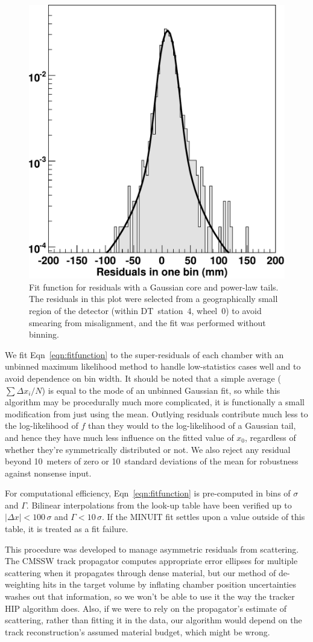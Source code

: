 \documentclass[12pt]{article}
\begin{document}
\begin{figure}
\begin{center} \includegraphics[width=0.4\linewidth]{fitfunction.pdf} \end{center}
\caption{Fit function for residuals with a Gaussian core and power-law tails.  The residuals in this plot were selected from a geographically small region of the detector (within DT~station~4, wheel~0) to avoid smearing from misalignment, and the fit was performed without binning. \label{fig:fitfunction}}
\end{figure}

We fit Eqn~\ref{eqn:fitfunction} to the super-residuals of each
chamber with an unbinned maximum likelihood method to handle
low-statistics cases well and to avoid dependence on bin width.  It
should be noted that a simple average ($\sum \Delta x_i/N$) is equal
to the mode of an unbinned Gaussian fit, so while this algorithm may
be procedurally much more complicated, it is functionally a small
modification from just using the mean.  Outlying residuals contribute
much less to the log-likelihood of $f$ than they would to the
log-likelihood of a Gaussian tail, and hence they have much less
influence on the fitted value of $x_0$, regardless of whether they're
symmetrically distributed or not.  We also reject any residual beyond
10~meters of zero or 10~standard deviations of the mean for
robustness against nonsense input.

For computational efficiency, Eqn~\ref{eqn:fitfunction} is
pre-computed in bins of $\sigma$ and $\Gamma$.  Bilinear
interpolations from the look-up table have been verified up to
$|\Delta x| < 100 \, \sigma$ and $\Gamma < 10 \, \sigma$.  If the
MINUIT fit settles upon a value outside of this table, it is treated
as a fit failure.

This procedure was developed to manage asymmetric residuals from
scattering.  The CMSSW track propagator computes appropriate error
ellipses for multiple scattering when it propagates through dense
material, but our method of de-weighting hits in the target volume by
inflating chamber position uncertainties washes out that information,
so we won't be able to use it the way the tracker HIP algorithm does.
Also, if we were to rely on the propagator's estimate of scattering,
rather than fitting it in the data, our algorithm would depend on the
track reconstruction's assumed material budget, which might be wrong.
\end{document}
